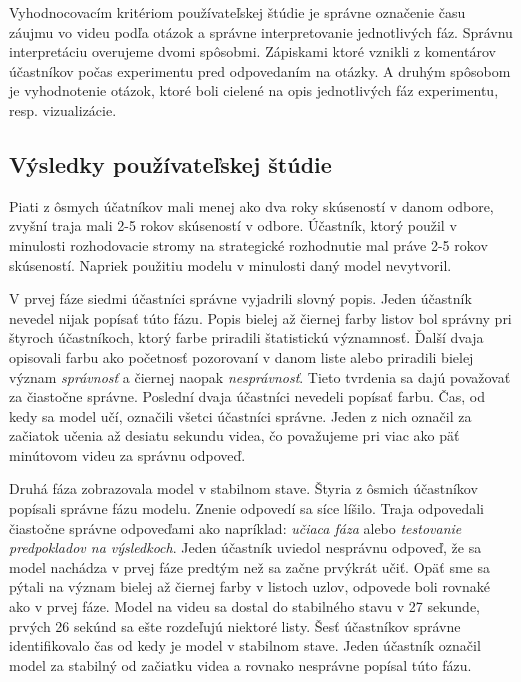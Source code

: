 \par
Vyhodnocovacím kritériom používateľskej štúdie je správne označenie času záujmu vo videu podľa otázok a správne interpretovanie jednotlivých fáz. Správnu interpretáciu overujeme dvomi spôsobmi. Zápiskami ktoré vznikli z komentárov účastníkov počas experimentu pred odpovedaním na otázky. A druhým spôsobom je vyhodnotenie otázok, ktoré boli cielené na opis jednotlivých fáz experimentu, resp. vizualizácie.


\subsection{Výsledky používateľskej štúdie}
Piati z ôsmych účatníkov mali menej ako dva roky skúseností v danom odbore, zvyšní traja mali 2-5 rokov skúseností v odbore. Účastník, ktorý použil v minulosti rozhodovacie stromy na strategické rozhodnutie mal práve 2-5 rokov skúseností. Napriek použitiu modelu v minulosti daný model nevytvoril.
\par
V prvej fáze siedmi účastníci správne vyjadrili slovný popis. Jeden účastník nevedel nijak popísať túto fázu. Popis bielej až čiernej farby listov bol správny pri štyroch účastníkoch, ktorý farbe priradili štatistickú významnosť. Ďalší dvaja opisovali farbu ako početnosť pozorovaní v danom liste alebo priradili bielej význam \textit{správnosť} a čiernej naopak \textit{nesprávnosť}. Tieto tvrdenia sa dajú považovať za čiastočne správne. Poslední dvaja účastníci nevedeli popísať farbu. Čas, od kedy sa model učí, označili všetci účastníci správne. Jeden z nich označil za začiatok učenia až desiatu sekundu videa, čo považujeme pri viac ako päť minútovom videu za správnu odpoveď.
\par
Druhá fáza zobrazovala model v stabilnom stave. Štyria z ôsmich účastníkov popísali správne fázu modelu. Znenie odpovedí sa síce líšilo. Traja odpovedali čiastočne správne odpoveďami ako napríklad: \textit{učiaca fáza} alebo \textit{testovanie predpokladov na výsledkoch}. Jeden účastník uviedol nesprávnu odpoveď, že sa model nachádza v prvej fáze predtým než sa začne prvýkrát učiť. Opäť sme sa pýtali na význam bielej až čiernej farby v listoch uzlov, odpovede boli rovnaké ako v prvej fáze. Model na videu sa dostal do stabilného stavu v 27 sekunde, prvých 26 sekúnd sa ešte rozdeľujú niektoré listy. Šesť účastníkov správne identifikovalo čas od kedy je model v stabilnom stave. Jeden účastník označil model za stabilný od začiatku videa a rovnako nesprávne popísal túto fázu.
